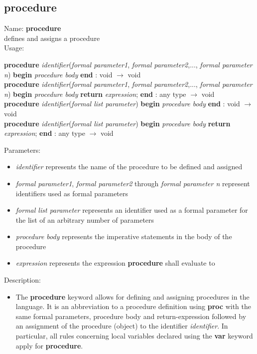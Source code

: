 \subsection{procedure}
\label{labprocedure}
\noindent Name: \textbf{procedure}\\
defines and assigns a \sollya procedure\\
\noindent Usage: 
\begin{center}
\textbf{procedure} \emph{identifier}(\emph{formal parameter1}, \emph{formal parameter2},..., \emph{formal parameter n}) \textbf{begin} \emph{procedure body} \textbf{end} : \textsf{void} $\rightarrow$ \textsf{void}\\
\textbf{procedure} \emph{identifier}(\emph{formal parameter1}, \emph{formal parameter2},..., \emph{formal parameter n}) \textbf{begin} \emph{procedure body} \textbf{return} \emph{expression}; \textbf{end} : \textsf{any type} $\rightarrow$ \textsf{void}\\
\textbf{procedure} \emph{identifier}(\emph{formal list parameter}) \textbf{begin} \emph{procedure body} \textbf{end} : \textsf{void} $\rightarrow$ \textsf{void}\\
\textbf{procedure} \emph{identifier}(\emph{formal list parameter}) \textbf{begin} \emph{procedure body} \textbf{return} \emph{expression}; \textbf{end} : \textsf{any type} $\rightarrow$ \textsf{void}\\
\end{center}
Parameters: 
\begin{itemize}
\item \emph{identifier} represents the name of the procedure to be defined and assigned
\item \emph{formal parameter1}, \emph{formal parameter2} through \emph{formal parameter n} represent identifiers used as formal parameters
\item \emph{formal list parameter} represents an identifier used as a formal parameter for the list of an arbitrary number of parameters
\item \emph{procedure body} represents the imperative statements in the body of the procedure
\item \emph{expression} represents the expression \textbf{procedure} shall evaluate to
\end{itemize}
\noindent Description: \begin{itemize}

\item The \textbf{procedure} keyword allows for defining and assigning procedures in
   the \sollya language. It is an abbreviation to a procedure definition
   using \textbf{proc} with the same formal parameters, procedure body and
   return-expression followed by an assignment of the procedure (object)
   to the identifier \emph{identifier}. In particular, all rules concerning
   local variables declared using the \textbf{var} keyword apply for \textbf{procedure}.
\end{itemize}
